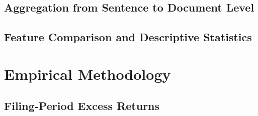 \documentclass[12pt,a4paper,oneside]{report}
\begin{document}
\section{Aggregation from Sentence to Document Level}
\label{sec:aggregation}

\section{Feature Comparison and Descriptive Statistics}
\label{sec:feature_descriptives}


\chapter{Empirical Methodology}
\label{ch:methodology}

\section{Filing-Period Excess Returns}
\label{sec:excess_returns}
\end{document}
